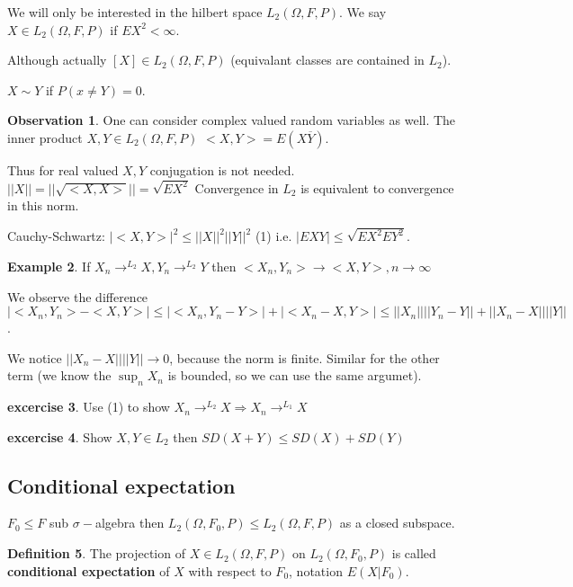 \documentclass[12pt,a4paper]{amsart}
\theoremstyle{definition} %
\newtheorem{defn}{Definition}[section]
\newtheorem{example}[defn]{Example}
\newtheorem{excercise}[defn]{excercise}
\newtheorem{observation}[defn]{Observation}
\theoremstyle{plain} %
\begin{document}
We will only be interested in the hilbert space $L_2(\Omega, F, P)$. We say $X \in L_2(\Omega, F, P)$ if $EX^2 < \infty$.

Although actually $[X] \in L_2(\Omega, F, P)$ (equivalant classes are contained in $L_2$). 

$X \sim Y$ if $P(x \neq Y) = 0$.

\begin{observation}
One can consider complex valued random variables as well. The inner product $X, Y \in L_2(\Omega, F, P)$
$<X,Y> = E(X \overline{Y})$.
\end{observation}

Thus for real valued $X,Y$ conjugation is not needed. 
$||  X || = ||\sqrt{<X,X>}|| = \sqrt{EX^2}$
Convergence in $L_2$ is equivalent to convergence in this norm.

Cauchy-Schwartz:
$|<X,Y>|^2 \leq ||X||^2 ||Y||^2$ (1)
i.e.
$|EXY| \leq \sqrt{EX^2 EY^2}$.

\begin{example}
If $X_n \rightarrow^{L_2} X, Y_n \rightarrow^{L_2} Y$ then
$<X_n, Y_n> \rightarrow <X,Y>, n\rightarrow \infty$
\end{example}
\proof
We observe the difference $|<X_n, Y_n> - <X,Y>| \leq |<X_n, Y_n - Y>| + |<X_n - X, Y>| \leq ||X_n|| ||Y_n - Y|| + ||X_n - X|| ||Y||$. 

We notice $||X_n - X||||Y||\rightarrow 0$, because the norm is finite. Similar for the other term (we know the $\sup_n X_n$ is bounded, so we can use the same argumet). 
\endproof


\begin{excercise}
Use 
(1) to show $X_n \rightarrow^{L_2} X \Rightarrow X_n \rightarrow^{L_1} X$
\end{excercise}


\begin{excercise}
Show $X, Y \in L_2$ then
$SD(X + Y) \leq SD(X) + SD(Y)$
\end{excercise}

\subsection{Conditional expectation}

$F_0 \leq F$ sub $\sigma-$algebra then
$L_2(\Omega, F_0, P) \leq L_2(\Omega, F, P)$ as a closed subspace.


\begin{defn}
The projection of $X \in L_2(\Omega, F, P)$ on  $L_2(\Omega, F_0, P)$ is called {\bf conditional expectation} of $X$ with respect to $F_0$, notation $E(X | F_0)$.
\end{defn}
\end{document}
